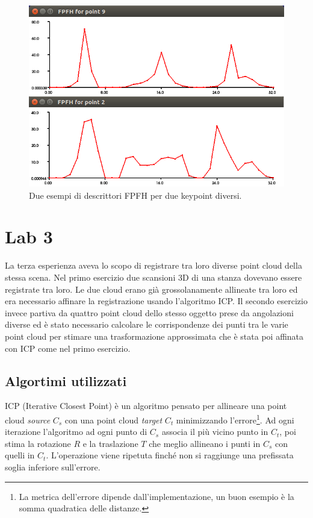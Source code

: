 \documentclass[a4paper]{article}
\begin{document}
	\begin{figure}
		\centering
		\includegraphics[width=1\textwidth]{images/lab2.png}
		\caption{\label{fig:lab2}Due esempi di descrittori FPFH per due keypoint diversi.}
	\end{figure}


\section{Lab 3} \label{sec:lab3}
La terza esperienza aveva lo scopo di registrare tra loro diverse point cloud della stessa scena. Nel primo esercizio due scansioni 3D di una stanza dovevano essere registrate tra loro. Le due cloud erano già grossolanamente allineate tra loro ed era necessario affinare la registrazione usando l'algoritmo ICP. Il secondo esercizio invece partiva da quattro point cloud dello stesso oggetto prese da angolazioni diverse ed è stato necessario calcolare le corrispondenze dei punti tra le varie point cloud per stimare una trasformazione approssimata che è stata poi affinata con ICP come nel primo esercizio.

	\subsection{Algortimi utilizzati}
	ICP (Iterative Closest Point) è un algoritmo pensato per allineare una point cloud \textit{source} $C_{s}$ con una point cloud \textit{target} $C_{t}$ minimizzando l'errore\footnote{La metrica dell'errore dipende dall'implementazione, un buon esempio è la somma quadratica delle distanze.}. Ad ogni iterazione l'algoritmo ad ogni punto di $C_{s}$ associa il più vicino punto in $C_{t}$, poi stima la rotazione $R$ e la traslazione $T$ che meglio allineano i punti in $C_{s}$ con quelli in  $C_{t}$. L'operazione viene ripetuta finché non si raggiunge una prefissata soglia inferiore sull'errore.
\end{document}
